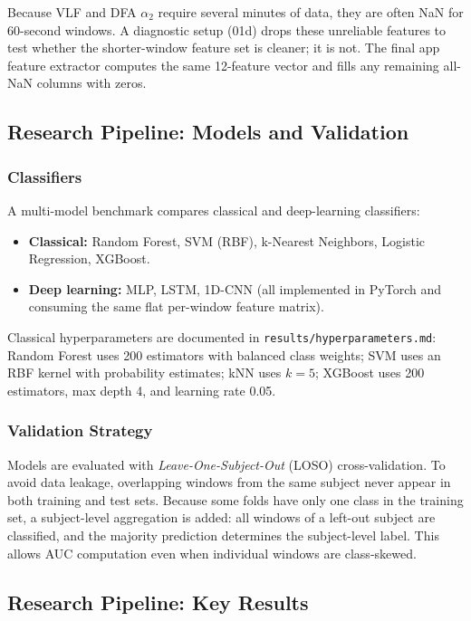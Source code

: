 Because VLF and DFA $\alpha_2$ require several minutes of data, they are often NaN for 60-second windows. A diagnostic setup (01d) drops these unreliable features to test whether the shorter-window feature set is cleaner; it is not. The final app feature extractor computes the same 12-feature vector and fills any remaining all-NaN columns with zeros.

\subsection{Research Pipeline: Models and Validation}

\subsubsection{Classifiers}

A multi-model benchmark compares classical and deep-learning classifiers:

\begin{itemize}
    \item \textbf{Classical:} Random Forest, SVM (RBF), k-Nearest Neighbors, Logistic Regression, XGBoost.
    \item \textbf{Deep learning:} MLP, LSTM, 1D-CNN (all implemented in PyTorch and consuming the same flat per-window feature matrix).
\end{itemize}

Classical hyperparameters are documented in \texttt{results/hyperparameters.md}: Random Forest uses 200 estimators with balanced class weights; SVM uses an RBF kernel with probability estimates; kNN uses $k=5$; XGBoost uses 200 estimators, max depth 4, and learning rate 0.05.

\subsubsection{Validation Strategy}

Models are evaluated with \textit{Leave-One-Subject-Out} (LOSO) cross-validation. To avoid data leakage, overlapping windows from the same subject never appear in both training and test sets. Because some folds have only one class in the training set, a subject-level aggregation is added: all windows of a left-out subject are classified, and the majority prediction determines the subject-level label. This allows AUC computation even when individual windows are class-skewed.

\subsection{Research Pipeline: Key Results}

